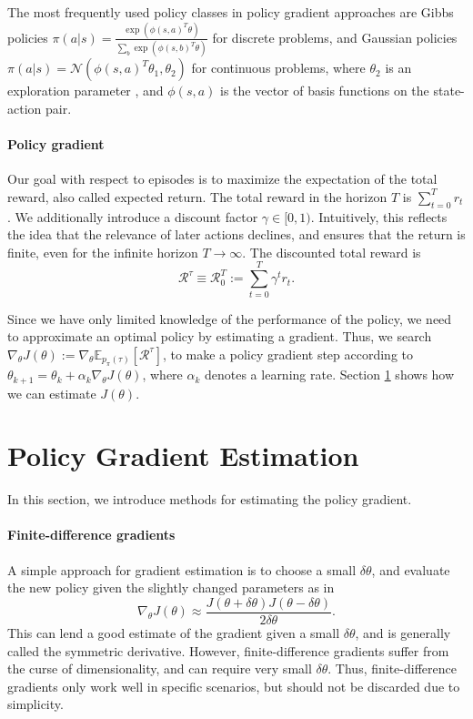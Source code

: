 \documentclass[final]{IEEEtran}
\begin{document}
The most frequently used policy classes in policy gradient approaches are Gibbs policies $\pi(a|s) = \frac{\exp(\phi(s,a)^T\theta)}{\sum_b \exp(\phi(s,b)^T\theta)}$ \cite{Sutton:1999:PGM:3009657.3009806,Bagnell2004LearningD} for discrete problems, and Gaussian policies $\pi(a|s) = \mathcal{N}(\phi(s,a)^T\theta_1,\theta_2)$ for continuous problems, where $\theta_2$ is an exploration parameter \cite{Williams92simplestatistical,peter:article:1996}, and $\phi(s,a)$ is the vector of basis functions on the state-action pair.

\paragraph{Policy gradient} 
Our goal with respect to episodes is to maximize the expectation of the total reward, also called expected return. 
The total reward in the horizon $T$ is $\sum_{t=0}^{T} r_{t}$. 
We additionally introduce a discount factor $\gamma \in [0,1)$.
Intuitively, this reflects the idea that the relevance of later actions declines, and ensures that the return is finite, even for the infinite horizon $T \to \infty$. 
The discounted total reward is 
\begin{equation}
  \mathcal{R}^\tau \equiv \mathcal{R}_0^T := \sum_{t=0}^{T} \gamma^t r_t.
  \label{eqn:acc-reward}
\end{equation}

Since we have only limited knowledge of the performance of the policy, we need to approximate an optimal policy by estimating a gradient. 
Thus, we search $\nabla_\theta J(\theta) := \nabla_\theta \mathbb{E}_{p_\pi(\tau)}\left[\mathcal{R}^\tau\right]$, to make a policy gradient step according to $\theta_{k+1} = \theta_k + \alpha_k \nabla_\theta J(\theta)$, where $\alpha_k$ denotes a learning rate. 
Section \ref{sec:pge} shows how we can estimate $J(\theta)$.

\section{Policy Gradient Estimation}
\label{sec:pge}

In this section, we introduce methods for estimating the policy gradient.

\paragraph{Finite-difference gradients} 
A simple approach for gradient estimation is to choose a small $\delta\theta$, and evaluate the new policy given the slightly changed parameters as in 
\begin{equation}
	\nabla_\theta J(\theta) \approx \frac{J(\theta+\delta\theta)J(\theta-\delta\theta)}{2\delta\theta}.
\end{equation} 
This can lend a good estimate of the gradient given a small $\delta \theta$, and is generally called the symmetric derivative. 
However, finite-difference gradients suffer from the curse of dimensionality, and can require very small $\delta\theta$.
Thus, finite-difference gradients only work well in specific scenarios, but should not be discarded due to simplicity.
\end{document}

